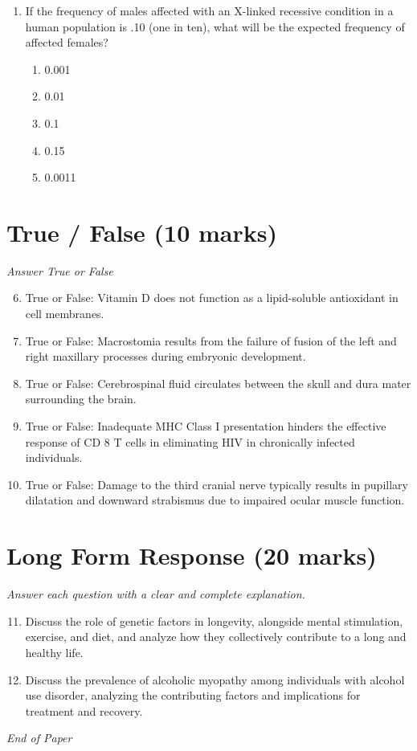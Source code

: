 \documentclass[12pt]{article}
\begin{document}
\begin{enumerate}[label=\arabic*.]
\begin{enumerate}[label=(\alph*)]
    \item Working part-time
    \item Mountain climbing
    \item Household chores
    \item Travel
\end{enumerate}
\item If the frequency of males affected with an X-linked recessive condition in a human population is .10 (one in ten), what will be the expected frequency of affected females?
\begin{enumerate}[label=(\alph*)]
    \item 0.001
    \item 0.01
    \item 0.1
    \item 0.15
    \item 0.0011
\end{enumerate}
\end{enumerate}

\section*{True / False (10 marks)}
\textit{Answer True or False}
\begin{enumerate}[label=\arabic*.]
\setcounter{enumi}{5}
\item True or False: Vitamin D does not function as a lipid-soluble antioxidant in cell membranes.
\item True or False: Macrostomia results from the failure of fusion of the left and right maxillary processes during embryonic development.
\item True or False: Cerebrospinal fluid circulates between the skull and dura mater surrounding the brain.
\item True or False: Inadequate MHC Class I presentation hinders the effective response of CD 8 T cells in eliminating HIV in chronically infected individuals.
\item True or False: Damage to the third cranial nerve typically results in pupillary dilatation and downward strabismus due to impaired ocular muscle function.
\end{enumerate}

\section*{Long Form Response (20 marks)}
\textit{Answer each question with a clear and complete explanation.}
\begin{enumerate}[label=\arabic*.]
\setcounter{enumi}{10}
\item Discuss the role of genetic factors in longevity, alongside mental stimulation, exercise, and diet, and analyze how they collectively contribute to a long and healthy life.
\item Discuss the prevalence of alcoholic myopathy among individuals with alcohol use disorder, analyzing the contributing factors and implications for treatment and recovery.
\end{enumerate}

\vfill
\noindent\textit{End of Paper}
\end{document}
